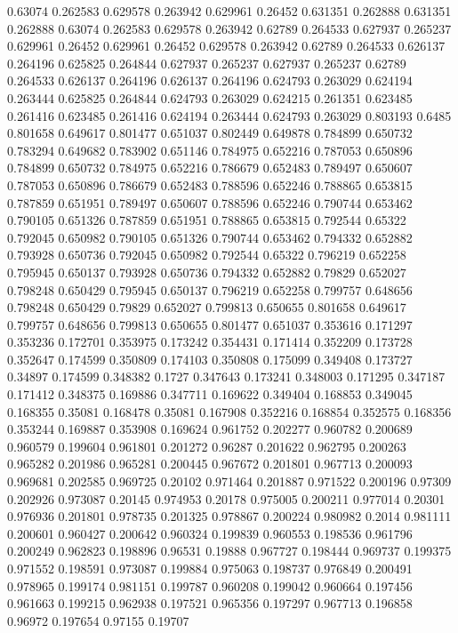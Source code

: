 0.63074 0.262583
0.629578 0.263942
0.629961 0.26452
0.631351 0.262888
0.631351 0.262888
0.63074 0.262583
0.629578 0.263942
0.62789 0.264533
0.627937 0.265237
0.629961 0.26452
0.629961 0.26452
0.629578 0.263942
0.62789 0.264533
0.626137 0.264196
0.625825 0.264844
0.627937 0.265237
0.627937 0.265237
0.62789 0.264533
0.626137 0.264196
0.626137 0.264196
0.624793 0.263029
0.624194 0.263444
0.625825 0.264844
0.624793 0.263029
0.624215 0.261351
0.623485 0.261416
0.623485 0.261416
0.624194 0.263444
0.624793 0.263029
0.803193 0.6485
0.801658 0.649617
0.801477 0.651037
0.802449 0.649878
0.784899 0.650732
0.783294 0.649682
0.783902 0.651146
0.784975 0.652216
0.787053 0.650896
0.784899 0.650732
0.784975 0.652216
0.786679 0.652483
0.789497 0.650607
0.787053 0.650896
0.786679 0.652483
0.788596 0.652246
0.788865 0.653815
0.787859 0.651951
0.789497 0.650607
0.788596 0.652246
0.790744 0.653462
0.790105 0.651326
0.787859 0.651951
0.788865 0.653815
0.792544 0.65322
0.792045 0.650982
0.790105 0.651326
0.790744 0.653462
0.794332 0.652882
0.793928 0.650736
0.792045 0.650982
0.792544 0.65322
0.796219 0.652258
0.795945 0.650137
0.793928 0.650736
0.794332 0.652882
0.79829 0.652027
0.798248 0.650429
0.795945 0.650137
0.796219 0.652258
0.799757 0.648656
0.798248 0.650429
0.79829 0.652027
0.799813 0.650655
0.801658 0.649617
0.799757 0.648656
0.799813 0.650655
0.801477 0.651037
0.353616 0.171297
0.353236 0.172701
0.353975 0.173242
0.354431 0.171414
0.352209 0.173728
0.352647 0.174599
0.350809 0.174103
0.350808 0.175099
0.349408 0.173727
0.34897 0.174599
0.348382 0.1727
0.347643 0.173241
0.348003 0.171295
0.347187 0.171412
0.348375 0.169886
0.347711 0.169622
0.349404 0.168853
0.349045 0.168355
0.35081 0.168478
0.35081 0.167908
0.352216 0.168854
0.352575 0.168356
0.353244 0.169887
0.353908 0.169624
0.961752 0.202277
0.960782 0.200689
0.960579 0.199604
0.961801 0.201272
0.96287 0.201622
0.962795 0.200263
0.965282 0.201986
0.965281 0.200445
0.967672 0.201801
0.967713 0.200093
0.969681 0.202585
0.969725 0.20102
0.971464 0.201887
0.971522 0.200196
0.97309 0.202926
0.973087 0.20145
0.974953 0.20178
0.975005 0.200211
0.977014 0.20301
0.976936 0.201801
0.978735 0.201325
0.978867 0.200224
0.980982 0.2014
0.981111 0.200601
0.960427 0.200642
0.960324 0.199839
0.960553 0.198536
0.961796 0.200249
0.962823 0.198896
0.96531 0.19888
0.967727 0.198444
0.969737 0.199375
0.971552 0.198591
0.973087 0.199884
0.975063 0.198737
0.976849 0.200491
0.978965 0.199174
0.981151 0.199787
0.960208 0.199042
0.960664 0.197456
0.961663 0.199215
0.962938 0.197521
0.965356 0.197297
0.967713 0.196858
0.96972 0.197654
0.97155 0.19707
